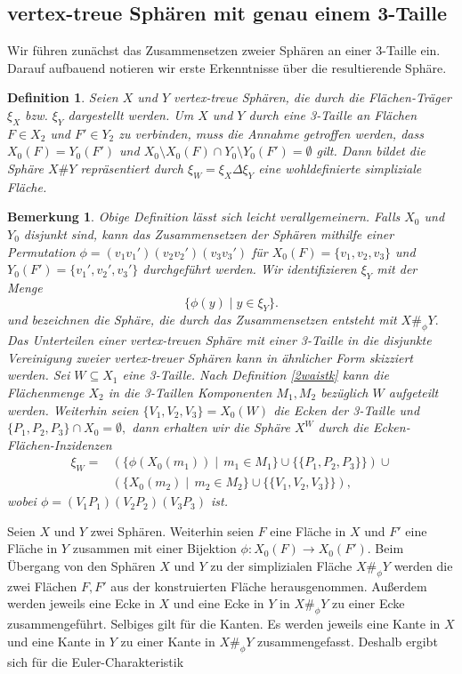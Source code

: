 \documentclass[12pt,titlepage,twoside,cleardoublepage]{article}
\theoremstyle{nummermitklammern}
\newtheorem{definition}[temp]{Definition}
\newtheorem{bemerkung}[temp]{Bemerkung}
\newtheorem{definition}[zahl]{Definition}
\newtheorem{bemerkung}[zahl]{Bemerkung}
\numberwithin{equation}{section}
\begin{document}
\subsection{vertex-treue Sphären mit genau einem 3-Taille}
Wir führen zunächst das Zusammensetzen zweier Sphären an einer 3-Taille ein. Darauf aufbauend notieren wir erste Erkenntnisse über die resultierende Sphäre. 
\begin{definition}
Seien $X$ und $Y$ vertex-treue Sphären, die durch die Flächen-Träger $\xi_X$ bzw. $\xi_Y$ dargestellt werden. Um $X$ und $Y$ durch eine 3-Taille an Flächen $F\in X_2$ und $F'\in Y_2$ zu verbinden, muss die Annahme getroffen werden, dass
$X_0(F)=Y_0(F')$ und $X_0\setminus X_0(F)\cap Y_0\setminus Y_0(F')=\emptyset$ gilt. Dann bildet die Sphäre $X\#Y$ repräsentiert durch $\xi_W=\xi_X \Delta \xi_Y$ eine wohldefinierte simpliziale Fläche.
\end{definition}
\begin{bemerkung}\label{3waist}
Obige Definition lässt sich leicht verallgemeinern. Falls $X_0$ und $Y_0$ disjunkt sind, kann das Zusammensetzen der Sphären mithilfe einer Permutation $\phi=(v_1v_1')(v_2v_2')(v_3v_3')$ für $X_0(F)=\{v_1,v_2,v_3\}$ und $Y_0(F')=\{v_1',v_2',v_3'\}$ durchgeführt werden. Wir identifizieren $\xi_Y$ mit der Menge  
\[
\{\phi (y)\mid y\in \xi_Y \}.
\]
und bezeichnen die Sphäre, die durch das Zusammensetzen  entsteht mit $X\#_{\phi}Y.$\\
Das Unterteilen einer vertex-treuen Sphäre mit einer 3-Taille in die disjunkte Vereinigung zweier vertex-treuer Sphären kann in ähnlicher Form skizziert werden. Sei $W\subseteq X_1$ eine 3-Taille. Nach Definition \ref{2waistk} kann die Flächenmenge $X_2$ in die 3-Taillen Komponenten $M_1,M_2$ bezüglich $W$ aufgeteilt werden. Weiterhin seien $\{V_1,V_2,V_3\}=X_0(W)$ die Ecken der 3-Taille und $\{P_1,P_2,P_3\}\cap X_0=\emptyset,$ dann erhalten wir die Sphäre $X^W$ durch die Ecken-Flächen-Inzidenzen 
\begin{align*}
\xi_W=&(\{\phi(X_0(m_1))\mid \, m_1\in M_1\}\cup \{\{P_1,P_2,P_3\}\}) \cup\\
 &(\{X_0(m_2)\mid \, m_2\in M_2\}\cup \{\{V_1,V_2,V_3\}\}),
\end{align*}
wobei $\phi=(V_1P_1)(V_2P_2)(V_3P_3)$ ist.
\end{bemerkung}
Seien $X$ und $Y$ zwei Sphären. Weiterhin seien  $F$ eine Fläche in $X$ und $F'$ eine Fläche in $Y$ zusammen mit einer Bijektion $\phi :X_0(F)\to X_0(F').$ Beim Übergang von den Sphären $X$ und $Y$ zu der simplizialen Fläche $X\#_\phi Y$ werden die zwei Flächen $F,F'$ aus der konstruierten Fläche herausgenommen. Außerdem werden jeweils eine Ecke in $X$ und eine Ecke in $Y$ in $X\#_\phi Y$ zu einer Ecke zusammengeführt. Selbiges gilt für die Kanten. Es werden jeweils eine Kante in $X$ und eine Kante in $Y$ zu einer Kante in $X\#_\phi Y$ zusammengefasst. Deshalb ergibt sich für die Euler-Charakteristik
\end{document}
